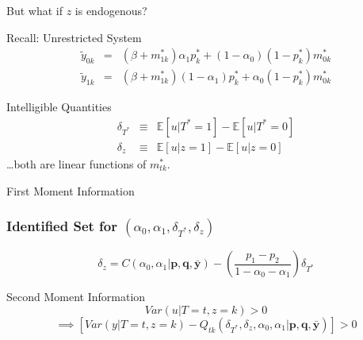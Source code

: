 \documentclass{beamer}
\begin{document}
\begin{frame}
  \begin{center}
    \huge But what if $z$ is endogenous? \\
  \end{center}
\end{frame}
\begin{frame}

  \begin{block}{Recall: Unrestricted System}
    \vspace{-1.5em}
    \small
  \begin{eqnarray*}
   \widetilde{y}_{0k}&=&  (\beta + m_{1k}^*) \alpha_1 p_k^*  + (1 -\alpha_0)(1 - p^*_k)m_{0k}^*  \\  
   \widetilde{y}_{1k}&=& (\beta + m_{1k}^*) (1 - \alpha_1)p_k^* + \alpha_0 (1 - p_k^*) m_{0k}^*
  \end{eqnarray*}
  \end{block}

  \begin{alertblock}{Intelligible Quantities}
    \vspace{-1.5em}
    \begin{eqnarray*}
      \delta_{T^*} &\equiv& \mathbb{E}\left[ u|T^*=1 \right] - \mathbb{E}\left[u|T^*=0 \right] \\
      \delta_{z} &\equiv& \mathbb{E}\left[ u|z=1 \right] - \mathbb{E}\left[u|z=0 \right] 
    \end{eqnarray*}
   \hfill \alert{\ldots both are linear functions of $m_{tk}^*$.}
  \end{alertblock}

\end{frame}
\begin{frame}
  \begin{block}{First Moment Information}
  \frametitle{Identified Set for $(\alpha_0, \alpha_1, \delta_{T^*}, \delta_z)$}
  \[
    \delta_z = C(\alpha_0, \alpha_1|\mathbf{p}, \mathbf{q}, \mathbf{\bar{y}}) - \left( \frac{p_1 - p_2}{1 - \alpha_0 - \alpha_1} \right) \delta_{T^*}
  \]
  \end{block}
  \begin{block}{Second Moment Information}
    \[Var(u|T = t,z = k) > 0\]  \[\implies
      \left[Var(y|T=t, z=k) - Q_{tk}(\delta_{T^*}, \delta_z,\alpha_0, \alpha_1|\mathbf{p}, \mathbf{q}, \mathbf{\bar{y}})\right] > 0\]

  \end{block}
\end{frame}
\end{document}
